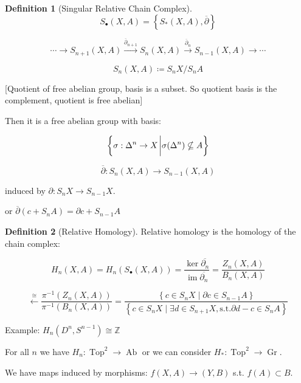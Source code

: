 \documentclass{article}
\theoremstyle{definition}
\newtheorem*{definition}{Definition}
\begin{document}
    \begin{definition}
        [Singular Relative Chain Complex]

        \[
            S_\bullet(X,A) = \left\{ S_{\ast} (X,A), \overline{\partial} \right\} 
        \]

        \[
            \cdots \to S_{n+1} (X,A) \xrightarrow{\overline{\partial}_{n+1}} S_n(X,A) \xrightarrow{\overline{\partial}_n} S_{n-1} (X,A) \to \cdots 
        \]

        \[
            S_n (X,A) \coloneqq S_n X / S_n A
        \]

        [Quotient of free abelian group, basis is a subset. So quotient basis is the complement, quotient is free abelian]

        Then it is a free abelian group with basis:

        \[
            \left\{ \sigma : \Delta^n \to X \eval \sigma(\Delta^n) \nsubseteq A \right\} 
        \]

        \[
            \overline{\partial}: S_n(X,A) \to S_{n-1} (X,A) 
        \]

        induced by \(\partial: S_n X \to S_{n-1} X\).

        or \(\overline{\partial } (c + S_n A) = \partial c + S_{n-1} A\) 

    \end{definition}

    \begin{definition}
        [Relative Homology] Relative homology is the homology of the chain complex:

        \[
            H_n (X,A) = H_n(S_{\bullet}(X,A)) = \frac{\ker \overline{\partial_n}}{\operatorname{im} \overline{\partial_n}} = \frac{Z_n(X,A)}{B_n(X,A)}
        \]

        \[
            \xleftarrow{\cong} \frac{\pi ^{-1} (Z_n(X,A))}{\pi ^{-1} (B_n(X,A))} = \frac{\left\{ c \in S_n X \mid \partial c \in S_{n-1} A \right\}}{\left\{ c \in S_n X \mid \exists d\in S_{n+1} X, \text{s.t.} \partial d - c \in S_n A \right\}} 
        \]
    \end{definition}

    Example: \(H_n(D^n, S^{n-1}) \cong \mathbb{Z}\) 

    For all \(n\) we have \(H_n: \operatorname{Top}^2 \to \operatorname{Ab}\) or we can consider \(H_{\ast} : \operatorname{Top}^2 \to \operatorname{Gr}\).

    We have maps induced by morphisms: \(f(X,A) \to (Y,B)\) s.t. \(f(A) \subset B\).
\end{document}
